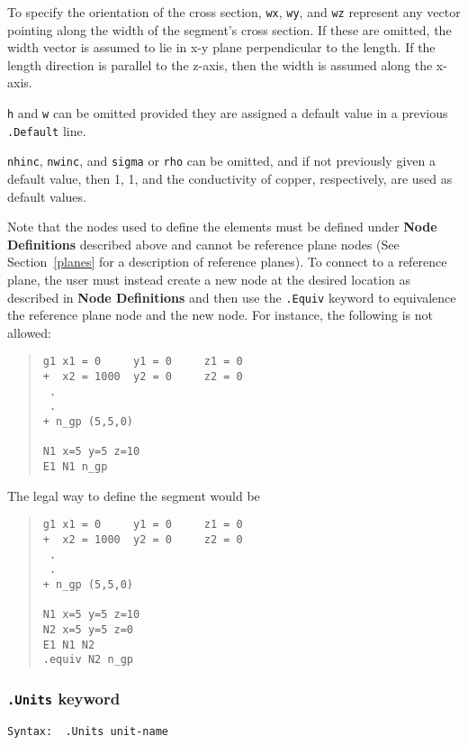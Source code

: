 To specify the orientation of the cross section, {\tt wx}, {\tt wy},
and {\tt wz} represent any vector pointing along the width of the
segment's cross section.  If these are omitted, the width vector is
assumed to lie in x-y plane perpendicular to the length.  If the
length direction is parallel to the z-axis, then the width is assumed
along the x-axis.

{\tt h} and {\tt w} can be omitted provided they are assigned a default
value in a previous {\tt .Default} line.

{\tt nhinc}, {\tt nwinc}, and {\tt sigma} or {\tt rho} can be omitted,
and if not previously given a default value, then 1, 1, and the
conductivity of copper, respectively, are used as default values. 

Note that the nodes used to define the elements must be defined
under {\bf Node Definitions} described above and cannot be reference
plane nodes (See Section~\ref{planes} for a description of reference
planes).  
To connect to a reference plane, the user must instead
create a new node at the desired location 
as described in {\bf Node Definitions} and then use the {\tt .Equiv}
keyword to equivalence the reference plane node and the new node. For
instance, the following is not allowed:
\begin{quote}
\begin{verbatim}
g1 x1 = 0     y1 = 0     z1 = 0
+  x2 = 1000  y2 = 0     z2 = 0
 .
 .
+ n_gp (5,5,0)

N1 x=5 y=5 z=10
E1 N1 n_gp 
\end{verbatim}
\end{quote}

\noindent The legal way to define the segment would be
\begin{quote}
\begin{verbatim}
g1 x1 = 0     y1 = 0     z1 = 0
+  x2 = 1000  y2 = 0     z2 = 0
 .
 .
+ n_gp (5,5,0)

N1 x=5 y=5 z=10
N2 x=5 y=5 z=0
E1 N1 N2
.equiv N2 n_gp
\end{verbatim}
\end{quote}

\subsubsection{{\tt .Units} keyword}

\begin{verbatim}
Syntax:  .Units unit-name
\end{verbatim}


